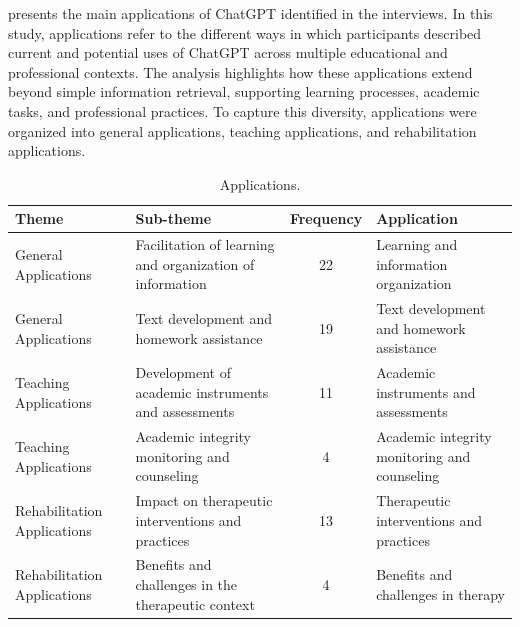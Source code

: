 \documentclass[english]{textolivre}
\begin{document}
 presents the main applications of ChatGPT identified in the interviews. In this study, applications refer to the different ways in which participants described current and potential uses of ChatGPT across multiple educational and professional contexts. The analysis highlights how these applications extend beyond simple information retrieval, supporting learning processes, academic tasks, and professional practices. To capture this diversity, applications were organized into general applications, teaching applications, and rehabilitation applications.

\begin{table}[h!]
\centering
\begin{threeparttable}
\caption{Applications.}
\label{tab6}
\begin{tabular}{p{3cm} p{3.5cm} c p{5cm}}
\toprule
Theme & Sub-theme & Frequency & Application \\ 
\midrule

General Applications &
Facilitation of learning and organization of information &
22 &
Learning and information organization \\

General Applications &
Text development and homework assistance &
19 &
Text development and homework assistance \\

Teaching Applications &
Development of academic instruments and assessments &
11 &
Academic instruments and assessments \\

Teaching Applications &
Academic integrity monitoring and counseling &
4 &
Academic integrity monitoring and counseling \\

Rehabilitation Applications &
Impact on therapeutic interventions and practices &
13 &
Therapeutic interventions and practices \\

Rehabilitation Applications &
Benefits and challenges in the therapeutic context &
4 &
Benefits and challenges in therapy \\

\bottomrule
\end{tabular}
\end{threeparttable}
\end{table}
\end{document}
